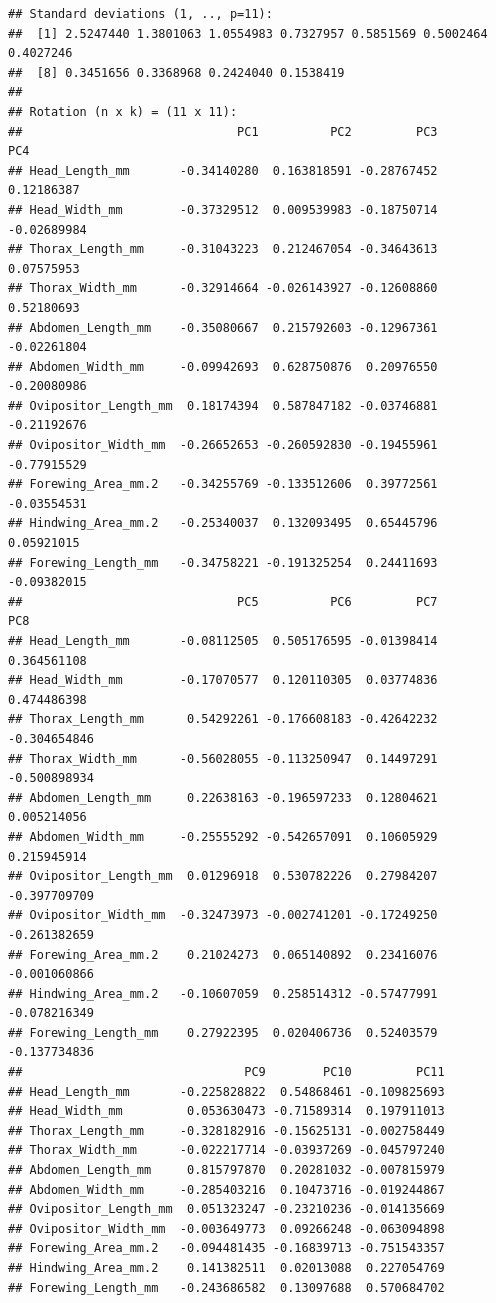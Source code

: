 \documentclass[]{article}
\begin{document}
\begin{verbatim}
## Standard deviations (1, .., p=11):
##  [1] 2.5247440 1.3801063 1.0554983 0.7327957 0.5851569 0.5002464 0.4027246
##  [8] 0.3451656 0.3368968 0.2424040 0.1538419
## 
## Rotation (n x k) = (11 x 11):
##                              PC1          PC2         PC3         PC4
## Head_Length_mm       -0.34140280  0.163818591 -0.28767452  0.12186387
## Head_Width_mm        -0.37329512  0.009539983 -0.18750714 -0.02689984
## Thorax_Length_mm     -0.31043223  0.212467054 -0.34643613  0.07575953
## Thorax_Width_mm      -0.32914664 -0.026143927 -0.12608860  0.52180693
## Abdomen_Length_mm    -0.35080667  0.215792603 -0.12967361 -0.02261804
## Abdomen_Width_mm     -0.09942693  0.628750876  0.20976550 -0.20080986
## Ovipositor_Length_mm  0.18174394  0.587847182 -0.03746881 -0.21192676
## Ovipositor_Width_mm  -0.26652653 -0.260592830 -0.19455961 -0.77915529
## Forewing_Area_mm.2   -0.34255769 -0.133512606  0.39772561 -0.03554531
## Hindwing_Area_mm.2   -0.25340037  0.132093495  0.65445796  0.05921015
## Forewing_Length_mm   -0.34758221 -0.191325254  0.24411693 -0.09382015
##                              PC5          PC6         PC7          PC8
## Head_Length_mm       -0.08112505  0.505176595 -0.01398414  0.364561108
## Head_Width_mm        -0.17070577  0.120110305  0.03774836  0.474486398
## Thorax_Length_mm      0.54292261 -0.176608183 -0.42642232 -0.304654846
## Thorax_Width_mm      -0.56028055 -0.113250947  0.14497291 -0.500898934
## Abdomen_Length_mm     0.22638163 -0.196597233  0.12804621  0.005214056
## Abdomen_Width_mm     -0.25555292 -0.542657091  0.10605929  0.215945914
## Ovipositor_Length_mm  0.01296918  0.530782226  0.27984207 -0.397709709
## Ovipositor_Width_mm  -0.32473973 -0.002741201 -0.17249250 -0.261382659
## Forewing_Area_mm.2    0.21024273  0.065140892  0.23416076 -0.001060866
## Hindwing_Area_mm.2   -0.10607059  0.258514312 -0.57477991 -0.078216349
## Forewing_Length_mm    0.27922395  0.020406736  0.52403579 -0.137734836
##                               PC9        PC10         PC11
## Head_Length_mm       -0.225828822  0.54868461 -0.109825693
## Head_Width_mm         0.053630473 -0.71589314  0.197911013
## Thorax_Length_mm     -0.328182916 -0.15625131 -0.002758449
## Thorax_Width_mm      -0.022217714 -0.03937269 -0.045797240
## Abdomen_Length_mm     0.815797870  0.20281032 -0.007815979
## Abdomen_Width_mm     -0.285403216  0.10473716 -0.019244867
## Ovipositor_Length_mm  0.051323247 -0.23210236 -0.014135669
## Ovipositor_Width_mm  -0.003649773  0.09266248 -0.063094898
## Forewing_Area_mm.2   -0.094481435 -0.16839713 -0.751543357
## Hindwing_Area_mm.2    0.141382511  0.02013088  0.227054769
## Forewing_Length_mm   -0.243686582  0.13097688  0.570684702
\end{verbatim}
\end{document}
